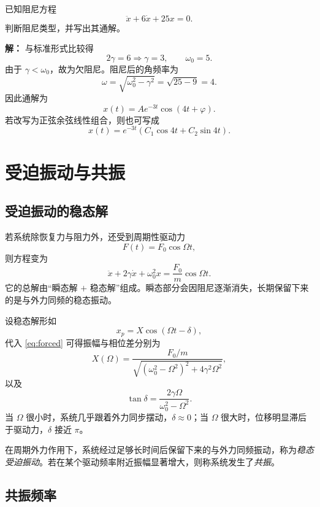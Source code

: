 \begin{example}
已知阻尼方程
\[
\ddot x+6\dot x+25x=0.
\]
判断阻尼类型，并写出其通解。

\textbf{解：} 与标准形式比较得
\[
2\gamma=6\Rightarrow \gamma=3,
\qquad
\omega_0=5.
\]
由于 $\gamma<\omega_0$，故为欠阻尼。阻尼后的角频率为
\[
\omega=\sqrt{\omega_0^2-\gamma^2}=\sqrt{25-9}=4.
\]
因此通解为
\[
x(t)=A e^{-3t}\cos(4t+\varphi).
\]
若改写为正弦余弦线性组合，则也可写成
\[
x(t)=e^{-3t}(C_1\cos4t+C_2\sin4t).
\]
\end{example}

\section{受迫振动与共振}

\subsection{受迫振动的稳态解}

若系统除恢复力与阻力外，还受到周期性驱动力
\[
F(t)=F_0\cos\Omega t,
\]
则方程变为
\begin{equation}
\ddot x+2\gamma\dot x+\omega_0^2x=\frac{F_0}{m}\cos\Omega t.
\label{eq:forced}
\end{equation}
它的总解由“瞬态解 $+$ 稳态解”组成。瞬态部分会因阻尼逐渐消失，长期保留下来的是与外力同频的稳态振动。

设稳态解形如
\[
x_p=X\cos(\Omega t-\delta),
\]
代入 \eqref{eq:forced} 可得振幅与相位差分别为
\begin{equation}
X(\Omega)=\frac{F_0/m}{\sqrt{(\omega_0^2-\Omega^2)^2+4\gamma^2\Omega^2}},
\label{eq:forced-amplitude}
\end{equation}
以及
\begin{equation}
\tan\delta=\frac{2\gamma\Omega}{\omega_0^2-\Omega^2}.
\label{eq:forced-phase}
\end{equation}
当 $\Omega$ 很小时，系统几乎跟着外力同步摆动，$\delta\approx 0$；当 $\Omega$ 很大时，位移明显滞后于驱动力，$\delta$ 接近 $\pi$。

\begin{definition}
在周期外力作用下，系统经过足够长时间后保留下来的与外力同频振动，称为\emph{稳态受迫振动}。若在某个驱动频率附近振幅显著增大，则称系统发生了\emph{共振}。
\end{definition}

\subsection{共振频率}

